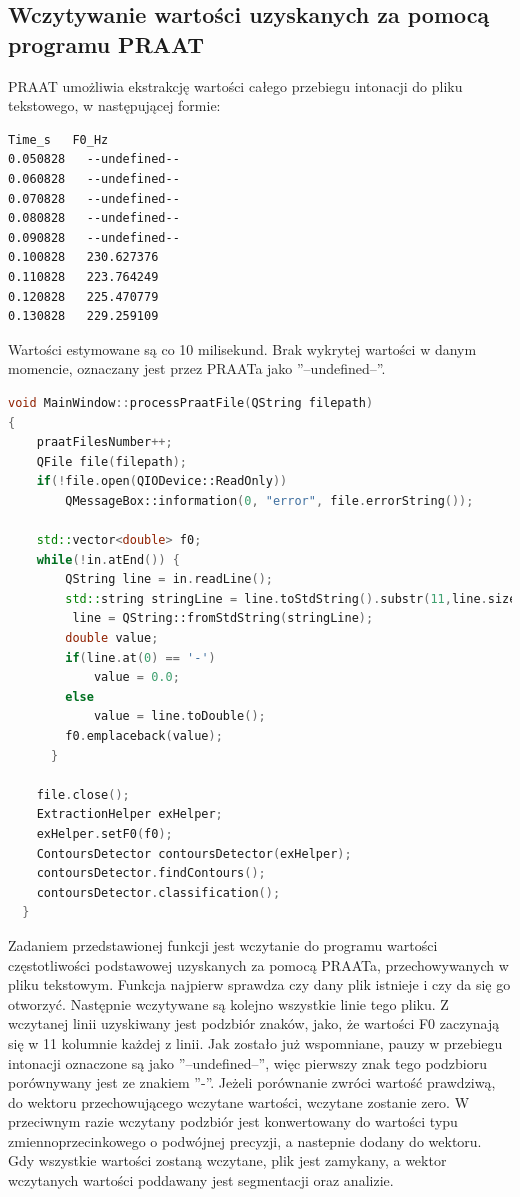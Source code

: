 \documentclass[a4paper,12 pt]{article}
\begin{document}
\subsection{Wczytywanie wartości  uzyskanych za pomocą programu PRAAT}
PRAAT umożliwia ekstrakcję wartości całego przebiegu intonacji do pliku tekstowego, w następującej formie:
\begin{lstlisting}
Time_s   F0_Hz
0.050828   --undefined--
0.060828   --undefined--
0.070828   --undefined--
0.080828   --undefined--
0.090828   --undefined--
0.100828   230.627376
0.110828   223.764249
0.120828   225.470779
0.130828   229.259109
\end{lstlisting}
Wartości estymowane są co 10 milisekund. Brak wykrytej wartości w danym momencie, oznaczany jest przez PRAATa jako ''--undefined--''.
\begin{lstlisting}[caption={Funkcja wczytująca do programu wartości F0 z pliku tekstowego},label={lst:label},language=C++]
void MainWindow::processPraatFile(QString filepath)
{
    praatFilesNumber++;
    QFile file(filepath);
    if(!file.open(QIODevice::ReadOnly)) 
        QMessageBox::information(0, "error", file.errorString());

    std::vector<double> f0;
    while(!in.atEnd()) {
        QString line = in.readLine();
        std::string stringLine = line.toStdString().substr(11,line.size());
         line = QString::fromStdString(stringLine);
        double value;
        if(line.at(0) == '-')
            value = 0.0;
        else
            value = line.toDouble();
        f0.emplaceback(value);
      }

    file.close();
    ExtractionHelper exHelper;
    exHelper.setF0(f0);
    ContoursDetector contoursDetector(exHelper);
    contoursDetector.findContours();
    contoursDetector.classification();
  }
\end{lstlisting}
Zadaniem przedstawionej funkcji jest wczytanie do programu wartości częstotliwości podstawowej uzyskanych za pomocą PRAATa, przechowywanych w pliku tekstowym. Funkcja najpierw sprawdza czy dany plik istnieje i czy da się go otworzyć. Następnie wczytywane są kolejno wszystkie linie tego pliku. Z wczytanej linii uzyskiwany jest podzbiór znaków, jako, że wartości F0 zaczynają się w 11 kolumnie każdej z linii. Jak zostało już wspomniane, pauzy w przebiegu intonacji oznaczone są jako ''--undefined--'', więc pierwszy znak tego podzbioru porównywany jest ze znakiem ''-''. Jeżeli porównanie zwróci wartość prawdziwą, do wektoru przechowującego wczytane wartości, wczytane zostanie zero. W przeciwnym razie wczytany podzbiór jest konwertowany do wartości typu zmiennoprzecinkowego o podwójnej precyzji, a nastepnie dodany do wektoru. Gdy wszystkie wartości zostaną wczytane, plik jest zamykany, a wektor wczytanych wartości poddawany jest segmentacji oraz analizie.
\end{document}
